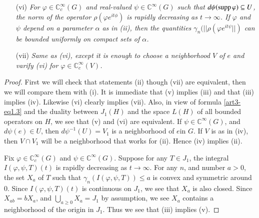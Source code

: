 \begin{itemize}
\item[(vi)] {\em For $\varphi\in \mathbb{C}^{\infty}_{c}(G)$ and real-valued $\psi\in \mathbb{C}^{\infty}(G)$ such that $d\psi(\operatorname{supp} \varphi)\subseteq U$, the norm of the operator $\rho(\varphi e^{it\phi})$ is rapidly decreasing as $t\to \infty$. If $\varphi$ and $\psi$ depend on a parameter $\alpha$ as in {\em(ii)}, then the quantities $\gamma_{n}(||\rho(\varphi e^{it\psi}||)$ can be bounded uniformly on compact sets of $\alpha$.}

\item[(vii)] {\em Same as {\rm(vi)}, except it is enough to choose a neighborhood $V$ of $e$ and varify {\em(vi)} for $\varphi\in \mathbb{C}^{\infty}_{c}(V)$.}
\end{itemize}

\begin{proof}
First we will check that statements (ii) though (vii) are equivalent, then we will compare them with (i). It is immediate that (v) implies (iii) and that (iii) implies (iv). Likewise (vi) clearly implies (vii). Also, in view of formula \eqref{art3-eq1.3} and the duality between $J_{1}(H)$ and the space $L(H)$ of all bounded operators on $H$, we see that (v) and (vi) are equivalent. If $\psi\in \mathbb{C}^{\infty}(G)$, and $d\psi(e)\in U$, then $d\psi^{-1}(U)=V_{1}$ is a neighborhood of $e$\pageoriginale in $G$. If $V$ is as in (iv), then $V\cap V_{1}$ will be a neighborhood that works for (ii). Hence (iv) implies (ii).

Fix $\varphi\in \mathbb{C}^{\infty}_{c}(G)$ and $\psi\in \mathbb{C}^{\infty}(G)$. Suppose for any $T\in J_{1}$, the integral $I(\varphi,\psi,T)(t)$ is rapidly decreasing as $t\to \infty$. For any $n$, and number $a>0$, the set $X_{a}$ of $T$ such that $\gamma_{n}(I(\varphi,\psi,T))\leq a$ is convex and symmetric around $0$. Since $I(\varphi,\psi,T)(t)$ is continuous on $J_{1}$, we see that $X_{a}$ is also closed. Since $X_{ab}=bX_{a}$, and $\bigcup\limits_{a\geq 0}X_{a}=J_{1}$ by assumption, we see $X_{a}$ contains a neighborhood of the origin in $J_{1}$. Thus we see that (iii) implies (v).


\end{proof}
